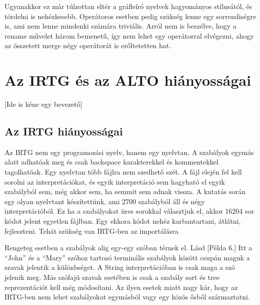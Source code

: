 Ugyanakkor ez már túlzottan eltér a gráfleíró nyelvek hagyományos stílusától, és tördelni is nehézkesebb. Operátoros esetben pedig szükség lenne egy sorrendiségre is, ami nem lenne mindenki számára triviális. Arról nem is beszélve, hogy a rename művelet három bemenetű, így nem lehet egy operátorral elvégezni, ahogy az összetett merge négy operátorát is erőltetetten hat.


\section{Az IRTG és az ALTO hiányosságai}
[Ide is kéne egy bevezető]
\subsection{Az IRTG hiányosságai}

Az IRTG nem egy programozási nyelv, hanem egy nyelvtan. A szabályok egymás alatt adhatóak meg és csak backspace karakterekkel és kommentekkel tagolhatóak. Egy nyelvtan több fájlra nem szedhető szét. A fájl elején fel kell sorolni az interpretációkat, és egyik interpretáció sem hagyható el egyik szabályból sem, még akkor sem, ha semmit sem adnak vissza. A kutatás során egy olyan nyelvtant készítettünk, ami 2700 szabályból áll és négy interpretációból. Ez ha a szabályokat üres sorokkal választjuk el, akkor 16204 sor kódot jelent egyetlen fájlban. Egy ekkora kódot nehéz karbantartani, átlátni, fejleszteni. Tehát szükség van IRTG-ben az importálásra


Rengeteg esetben a szabályok alig egy-egy szóban térnek el. Lásd [Példa 6.]
Itt a “John” és a “Mary” szóhoz tartozó terminális szabályok között csupán maguk a szavak jelentik a különbséget. A String interpretációban is csak maga a szó jelenik meg. Más szófajú szavak esetében is csak a szabály sort és tree reprezentációt kell még módosítani. Az ilyen esetek miatt nagy kár, hogy az IRTG-ben nem lehet szabályokat egymásból vagy egy közös ősből származtatni.



